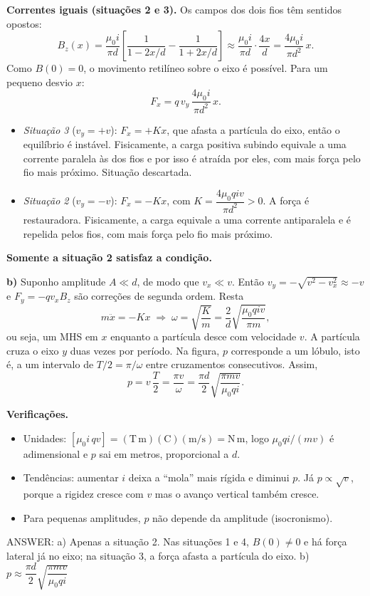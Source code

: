 \documentclass{article}%
\begin{document}
\textbf{Correntes iguais (situações 2 e 3).} Os campos dos dois fios têm sentidos opostos:
\[
B_z(x)=\frac{\mu_0 i}{\pi d}\left[\frac{1}{1-2x/d}-\frac{1}{1+2x/d}\right]\approx\frac{\mu_0 i}{\pi d}\cdot\frac{4x}{d}=\frac{4\mu_0 i}{\pi d^2}\,x .
\]
Como $B(0)=0$, o movimento retilíneo sobre o eixo é possível. Para um pequeno desvio $x$:
\[
F_x=q\,v_y\,\frac{4\mu_0 i}{\pi d^2}\,x .
\]
\begin{itemize}
\item \emph{Situação 3} ($v_y=+v$): $F_x=+Kx$, que afasta a partícula do eixo, então o equilíbrio é instável. Fisicamente, a carga positiva subindo equivale a uma corrente paralela às dos fios e por isso é atraída por eles, com mais força pelo fio mais próximo. Situação descartada.
\item \emph{Situação 2} ($v_y=-v$): $F_x=-Kx$, com $K=\dfrac{4\mu_0 q i v}{\pi d^2}>0$. A força é restauradora. Fisicamente, a carga equivale a uma corrente antiparalela e é repelida pelos fios, com mais força pelo fio mais próximo.
\end{itemize}
\textbf{Somente a situação 2 satisfaz a condição.}

\textbf{b)} Suponho amplitude $A\ll d$, de modo que $v_x\ll v$. Então $v_y=-\sqrt{v^2-v_x^2}\approx -v$ e $F_y=-q v_xB_z$ são correções de segunda ordem. Resta
\[
m\ddot x=-Kx\;\Rightarrow\;\omega=\sqrt{\frac{K}{m}}=\frac{2}{d}\sqrt{\frac{\mu_0 q i v}{\pi m}} ,
\]
ou seja, um MHS em $x$ enquanto a partícula desce com velocidade $v$. A partícula cruza o eixo $y$ duas vezes por período. Na figura, $p$ corresponde a um lóbulo, isto é, a um intervalo de $T/2=\pi/\omega$ entre cruzamentos consecutivos. Assim,
\[
p=v\,\frac{T}{2}=\frac{\pi v}{\omega}=\frac{\pi d}{2}\sqrt{\frac{\pi m v}{\mu_0 q i}} .
\]

\textbf{Verificações.}
\begin{itemize}
\item Unidades: $[\mu_0 i\,q v]=(\mathrm{T\,m})(\mathrm{C})(\mathrm{m/s})=\mathrm{N\,m}$, logo $\mu_0 q i/(m v)$ é adimensional e $p$ sai em metros, proporcional a $d$.
\item Tendências: aumentar $i$ deixa a ``mola'' mais rígida e diminui $p$. Já $p\propto\sqrt{v}$, porque a rigidez cresce com $v$ mas o avanço vertical também cresce.
\item Para pequenas amplitudes, $p$ não depende da amplitude (isocronismo).
\end{itemize}

ANSWER: a) Apenas a situação 2. Nas situações 1 e 4, $B(0)\neq0$ e há força lateral já no eixo; na situação 3, a força afasta a partícula do eixo. b) $p\approx \dfrac{\pi d}{2}\sqrt{\dfrac{\pi m v}{\mu_0 q i}}$%
\newpage%
\end{document}
